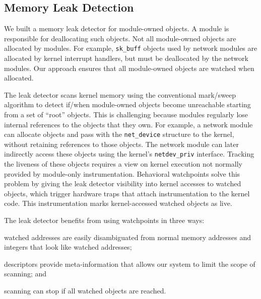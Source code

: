 \documentclass[letterpaper,twocolumn,10pt]{article}
\begin{document}
\subsection{Memory Leak Detection\label{sec:memory_leaks}}
We built a memory leak detector for module-owned objects. A module is responsible for deallocating such objects. Not all module-owned objects are allocated by modules. For example, \texttt{sk\_buff} objects used by network modules are allocated by kernel interrupt handlers, but must be deallocated by the network modules. Our approach ensures that all module-owned objects are watched when allocated.

The leak detector scans kernel memory using the conventional mark/sweep algorithm \cite{Boehm:1991:MPG:113445.113459} to detect if/when module-owned objects become unreachable starting from a set of ``root'' objects. This is challenging because modules regularly lose internal references to the objects that they own. For example, a network module can allocate objects and pass with the \texttt{net\_device} structure to the kernel, without retaining references to those objects. The network module can later indirectly access these objects using the kernel's \texttt{netdev\_priv} interface. Tracking the liveness of these objects requires a view on kernel execution not normally provided by module-only instrumentation. Behavioral watchpoints solve this problem by giving the leak detector visibility into kernel accesses to watched objects, which trigger hardware traps that attach instrumentation to the kernel code. This instrumentation marks kernel-accessed watched objects as live.

The leak detector benefits from using watchpoints in three ways: \begin{inparaenum}[i)]
	\item watched addresses are easily disambiguated from normal memory addresses and integers that look like watched addresses;
	\item descriptors provide meta-information that allows our system to limit the scope of scanning; and
	\item scanning can stop if all watched objects are reached.
\end{inparaenum}

\end{document}

